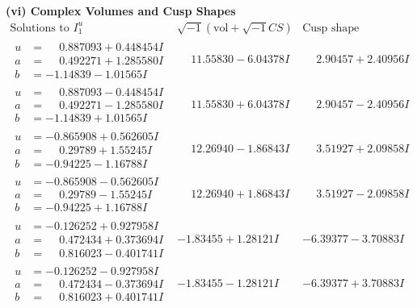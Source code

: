 \documentclass[1p]{elsarticle_modified}
\theoremstyle{definition}
\newcommand{\I}{\sqrt{-1}}
\begin{document}
\newpage\flushleft \textbf{(vi) Complex Volumes and Cusp Shapes}
$$\begin{array}{c|c|c}  
\text{Solutions to }I^u_{1}& \I (\text{vol} + \sqrt{-1}CS) & \text{Cusp shape}\\
 \hline 
\begin{aligned}
u &= \phantom{-}0.887093 + 0.448454 I \\
a &= \phantom{-}0.492271 + 1.285580 I \\
b &= -1.14839 - 1.01565 I\end{aligned}
 & \phantom{-}11.55830 - 6.04378 I & \phantom{-}2.90457 + 2.40956 I \\ \hline\begin{aligned}
u &= \phantom{-}0.887093 - 0.448454 I \\
a &= \phantom{-}0.492271 - 1.285580 I \\
b &= -1.14839 + 1.01565 I\end{aligned}
 & \phantom{-}11.55830 + 6.04378 I & \phantom{-}2.90457 - 2.40956 I \\ \hline\begin{aligned}
u &= -0.865908 + 0.562605 I \\
a &= \phantom{-}0.29789 + 1.55245 I \\
b &= -0.94225 - 1.16788 I\end{aligned}
 & \phantom{-}12.26940 - 1.86843 I & \phantom{-}3.51927 + 2.09858 I \\ \hline\begin{aligned}
u &= -0.865908 - 0.562605 I \\
a &= \phantom{-}0.29789 - 1.55245 I \\
b &= -0.94225 + 1.16788 I\end{aligned}
 & \phantom{-}12.26940 + 1.86843 I & \phantom{-}3.51927 - 2.09858 I \\ \hline\begin{aligned}
u &= -0.126252 + 0.927958 I \\
a &= \phantom{-}0.472434 + 0.373694 I \\
b &= \phantom{-}0.816023 - 0.401741 I\end{aligned}
 & -1.83455 + 1.28121 I & -6.39377 - 3.70883 I \\ \hline\begin{aligned}
u &= -0.126252 - 0.927958 I \\
a &= \phantom{-}0.472434 - 0.373694 I \\
b &= \phantom{-}0.816023 + 0.401741 I\end{aligned}
 & -1.83455 - 1.28121 I & -6.39377 + 3.70883 I \\ \hline\begin{aligned}

\end{aligned}
\end{array}$$
\end{document}
